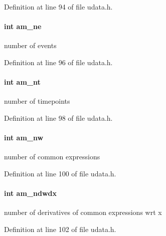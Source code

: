Definition at line 94 of file udata.\+h.

\hypertarget{struct_user_data_a1ee2e63bd2b30c7196b4984014fbc3a4}{}
\paragraph[{am\+\_\+ne}]{\setlength{\rightskip}{0pt plus 5cm}int am\+\_\+ne}\label{struct_user_data_a1ee2e63bd2b30c7196b4984014fbc3a4}
number of events 

Definition at line 96 of file udata.\+h.

\hypertarget{struct_user_data_a08ea6ecb241cd86a6f171761a48e27dd}{}
\paragraph[{am\+\_\+nt}]{\setlength{\rightskip}{0pt plus 5cm}int am\+\_\+nt}\label{struct_user_data_a08ea6ecb241cd86a6f171761a48e27dd}
number of timepoints 

Definition at line 98 of file udata.\+h.

\hypertarget{struct_user_data_abafd93498a922dbe7a03af57f45fcee9}{}
\paragraph[{am\+\_\+nw}]{\setlength{\rightskip}{0pt plus 5cm}int am\+\_\+nw}\label{struct_user_data_abafd93498a922dbe7a03af57f45fcee9}
number of common expressions 

Definition at line 100 of file udata.\+h.

\hypertarget{struct_user_data_a0723cf4e6ad49bf9d0eb18de66fdcd07}{}
\paragraph[{am\+\_\+ndwdx}]{\setlength{\rightskip}{0pt plus 5cm}int am\+\_\+ndwdx}\label{struct_user_data_a0723cf4e6ad49bf9d0eb18de66fdcd07}
number of derivatives of common expressions wrt x 

Definition at line 102 of file udata.\+h.


